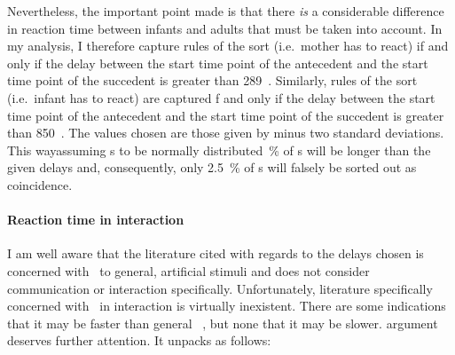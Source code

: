 Nevertheless, the important point made is that there \emph{is} a considerable difference in reaction time between infants and adults that must be taken into account.
In my analysis, I therefore capture rules of the sort  (i.e.~mother has to react) if and only if the delay between the start time point of the antecedent and the start time point of the succedent is greater than 289~\ms.
Similarly, rules of the sort  (i.e.~infant has to react) are captured f and only if the delay between the start time point of the antecedent and the start time point of the succedent is greater than 850~\ms.
The values chosen are those given by \citet{leibold_relationship_2002} minus two standard deviations.
This way\dash assuming \rt s to be normally distributed~\% of \rt s will be longer than the given delays \citep[]{moore_introduction_2017} and, consequently, only 2.5~\% of \rt s will falsely be sorted out as coincidence.

\paragraph{Reaction time in interaction}
I am well aware that the literature cited with regards to the delays chosen is concerned with \rt\ to general, artificial stimuli and does not consider communication or interaction specifically.
Unfortunately, literature specifically concerned with \rt\ in interaction is virtually inexistent.
There are some indications that it may be faster than general \rt\ \citep{levinson_turn-taking_2016}, but none that it may be slower.
 argument deserves further attention.
It unpacks as follows:

